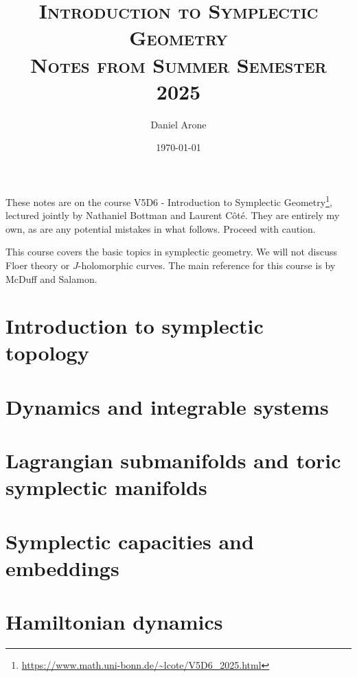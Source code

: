 \documentclass{article} %
\title{\textsc{Introduction to Symplectic Geometry\\ Notes from Summer Semester 2025}}
\author{Daniel Arone}
\date{\today}
\begin{document}
\maketitle

These notes are on the course V5D6 - Introduction to Symplectic Geometry\footnote{\href{https://www.math.uni-bonn.de/~lcote/V5D6_2025.html}{https://www.math.uni-bonn.de/\textasciitilde lcote/V5D6\_2025.html}}, lectured jointly by Nathaniel Bottman and  Laurent Côté.
They are entirely my own, as are any potential mistakes in what follows.
Proceed with caution.

This course covers the basic topics in symplectic geometry.
We will not discuss Floer theory or $J$-holomorphic curves.
The main reference for this course is \cite{intro} by McDuff and Salamon.

\tableofcontents

\pagebreak

\section{Introduction to symplectic topology}




\section{Dynamics and integrable systems}


\newlecture{}


\section{Lagrangian submanifolds and toric symplectic manifolds}
\newlecture{}


\newlecture{}


\section{Symplectic capacities and embeddings}
\newlecture{}


\newlecture{}


\newlecture{}


\newlecture{}


\section{Hamiltonian dynamics}
\newlecture{}


\printbibliography
\end{document}
